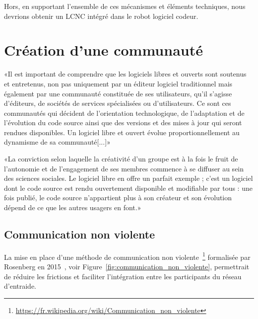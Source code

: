 Hors, en supportant l'ensemble de ces mécanismes et éléments techniques, nous devrions obtenir un LCNC intégré dans le robot logiciel codeur.



\section{Création d’une communauté}


«Il est important de comprendre que les logiciels libres et ouverts sont soutenus et entretenus, non pas uniquement par un éditeur logiciel traditionnel mais également par une communauté constituée de ses utilisateurs, qu'il s'agisse d'éditeurs, de sociétés de services spécialisées ou d'utilisateurs. Ce sont ces communautés qui décident de l'orientation technologique, de l'adaptation et de l'évolution du code source ainsi que des versions et des mises à jour qui seront rendues disponibles. Un logiciel libre et ouvert évolue proportionnellement au dynamisme de sa communauté[...]»~\cite{tresor_gouv_logiciels_libres}

«La conviction selon laquelle la créativité d’un groupe est à la fois le fruit de l’autonomie et de l’engagement de ses membres commence à se diffuser au sein des sciences sociales. Le logiciel libre en offre un parfait exemple ; c’est un logiciel dont le code source est rendu ouvertement disponible et modifiable par tous : une fois publié, le code source n’appartient plus à son créateur et son évolution dépend de ce que les autres usagers en font.»~\cite{REDP_173_0387}

\subsection{Communication non violente}

La mise en place d’une méthode de communication non violente~\footnote{\url{https://fr.wikipedia.org/wiki/Communication_non_violente}} formalisée par Rosenberg en 2015~\cite{rosenberg2015nonviolent}, voir Figure~\ref{fig:communication_non_violente}, permettrait de réduire les frictions et faciliter l'intégration entre les participants du réseau d’entraide.

